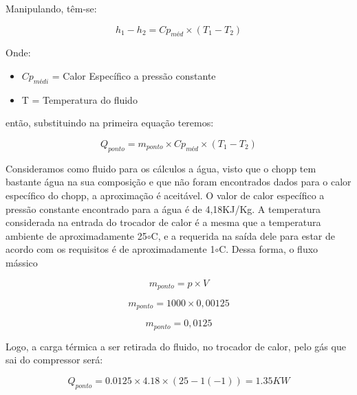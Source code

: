             Manipulando, têm-se:

            \begin{equation}
                h_1 - h_2 = Cp_{méd} \times (T_1 - T_2)
            \end{equation}

            Onde:
            \begin{itemize}
                \item $Cp_{médi}$ = Calor Específico a pressão constante
                \item T = Temperatura do fluido
            \end{itemize}
            então, substituindo na primeira equação teremos:

            \begin{equation}
                Q_{ponto} = m_{ponto} \times Cp_{méd} \times (T_1 - T_2)
            \end{equation}

            Consideramos como fluido para os cálculos a água, visto que o chopp tem bastante 
            água na sua composição e que não foram encontrados dados para o calor específico 
            do chopp, a aproximação é aceitável. O valor de calor específico a pressão constante
            encontrado para a água é de 4,18KJ/Kg. A temperatura considerada na entrada do 
            trocador de calor é a mesma que a temperatura ambiente de aproximadamente 25$\circ$C,
            e a requerida na saída dele para estar de acordo com os requisitos é de
            aproximadamente 1$\circ$C. Dessa forma, o fluxo mássico

            \begin{equation}
                m_{ponto} = p \times V
            \end{equation}

            \begin{equation}
                m_{ponto} = 1000 \times 0,00125
            \end{equation}

            \begin{equation}
                m_{ponto} = 0,0125
            \end{equation}

            Logo, a carga térmica a ser retirada do fluido, no trocador de calor,
            pelo gás que sai do compressor será:
            
            \begin{equation}
                Q_{ponto} = 0.0125 \times 4.18 \times (25-1(-1)) = 1.35 KW
            \end{equation}

